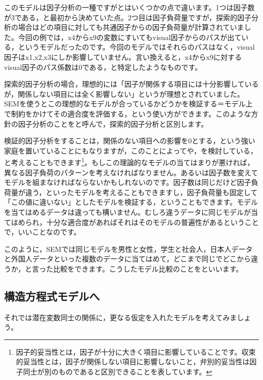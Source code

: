 \documentclass{ltjsbook}
\begin{document}
このモデルは因子分析の一種ですがとはいくつかの点で違います。1つは因子数が3である，と最初から決めていた点。2つ目は因子負荷量ですが，探索的因子分析の場合はどの項目に対しても共通因子からの因子負荷量が計算されていました。今回の例では，x4からx9の変数にすいてもvisual因子からのパスが出ている，というモデルだったのです。今回のモデルではそれらのパスはなく，visual因子はx1,x2,x3にしか影響していません。言い換えると，x4からx9に対するvisual因子のパス係数は0である，と特定したようなものです。

探索的因子分析の場合，理想的には「因子が関係する項目には十分影響しているが，関係しない項目には全く影響しない」というが理想とされていました。SEMを使うとこの理想的なモデルが合っているかどうかを検証する＝モデル上で制約をかけてその適合度を評価する，という使い方ができます。このような方針の因子分析のことをと呼んで，探索的因子分析と区別します。

検証的因子分析をすることは，関係のない項目への影響を0とする，という強い家庭を置いていることにもなりますが，このことによってや，を検討している，と考えることもできます\footnote{因子的妥当性とは，因子が十分に大きく項目に影響していることです。収束的妥当性とは，因子が関係しない項目に影響しないこと，弁別的妥当性は因子同士が別のものであると区別できることを表しています。}。もしこの理論的なモデルの当てはまりが悪ければ，異なる因子負荷のパターンを考えなければなりません。あるいは因子数を変えてモデルを組まなければならないかもしれないのです。因子数は同じだけど因子負荷量が違う，といったモデルを考えることもできますし，因子負荷量も固定して「この値に違いない」としたモデルを検証する，ということもできます。モデルを当てはめるデータは違っても構いません。むしろ違うデータに同じモデルが当てはめられ，十分な適合度があればそれはそのモデルの普遍性があるということで，いいことなのです。

このように，SEMでは同じモデルを男性と女性，学生と社会人，日本人データと外国人データといった複数のデータに当てはめて，どこまで同じでどこから違うか，と言った比較をできます。こうしたモデル比較のことをといいます。

\subsection{構造方程式モデルへ}
それでは潜在変数同士の関係に，更なる仮定を入れたモデルを考えてみましょう。
\end{document}
